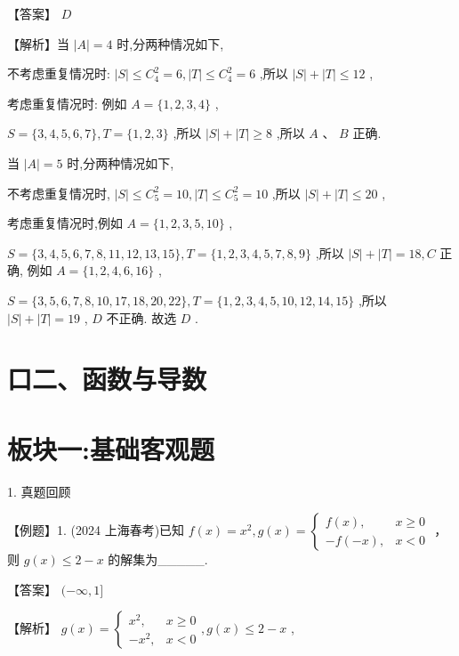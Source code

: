 \documentclass[10pt]{article}
\begin{document}
【答案】 \(D\)

【解析】当 \(\left| A\right|  = 4\) 时,分两种情况如下,

不考虑重复情况时: \(\left| S\right|  \leq  {C}_{4}^{2} = 6,\left| T\right|  \leq  {C}_{4}^{2} = 6\) ,所以 \(\left| S\right|  + \left| T\right|  \leq  {12}\) ,

考虑重复情况时: 例如 \(A = \{ 1,2,3,4\}\) ,

\(S = \{ 3,4,5,6,7\} ,T = \{ 1,2,3\}\) ,所以 \(\left| S\right|  + \left| T\right|  \geq  8\) ,所以 \(A\text{ 、 }B\) 正确.

当 \(\left| A\right|  = 5\) 时,分两种情况如下,

不考虑重复情况时, \(\left| S\right|  \leq  {C}_{5}^{2} = {10},\left| T\right|  \leq  {C}_{5}^{2} = {10}\) ,所以 \(\left| S\right|  + \left| T\right|  \leq  {20}\) ,

考虑重复情况时,例如 \(A = \{ 1,2,3,5,{10}\}\) ,

\(S = \{ 3,4,5,6,7,8,{11},{12},{13},{15}\} ,T = \{ 1,2,3,4,5,7,8,9\}\) ,所以 \(\left| S\right|  + \left| T\right|  = {18},C\) 正确, 例如 \(A = \{ 1,2,4,6,{16}\}\) ,

\(S = \{ 3,5,6,7,8,{10},{17},{18},{20},{22}\} ,T = \{ 1,2,3,4,5,{10},{12},{14},{15}\}\) ,所以 \(\left| S\right|  + \left| T\right|  = {19}\) , \(D\) 不正确. 故选 \(D\) .

\section*{口二、函数与导数}

\section*{板块一:基础客观题}

1. 真题回顾

【例题】1. (2024 上海春考)已知 \(f\left( x\right)  = {x}^{2},g\left( x\right)  = \left\{  \begin{array}{ll} f\left( x\right) , & x \geq  0 \\   - f\left( {-x}\right) , & x < 0 \end{array}\right.\) ，则 \(g\left( x\right)  \leq  2 - x\) 的解集为\_\_\_\_\_.

【答案】 \(( - \infty ,1\rbrack\)

【解析】 \(g\left( x\right)  = \left\{  {\begin{array}{ll} {x}^{2}, & x \geq  0 \\   - {x}^{2}, & x < 0 \end{array},g\left( x\right)  \leq  2 - x}\right.\) ,
\end{document}
